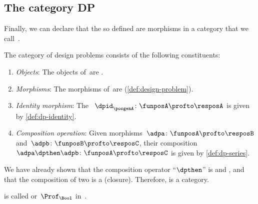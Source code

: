 \subsection{The category DP}

Finally, we can declare that the  so defined are morphisms in a category that we call~\DP.


\begin{definition}
    \label{def:DP}
    The category of design problems \DP consists of the following constituents:
    \begin{enumerate}
        \item \emph{Objects}: The objects of~\DP are .
        \item \emph{Morphisms}: The morphisms of~\DP are  (\cref{def:design-problem}).
        \item \emph{Identity morphism}: The ~$\dpid_\posgenA \colon \funposA \profto \resposA$ is given by \cref{def:dp-identity}.
        \item \emph{Composition operation}: Given morphisms~$\adpa \colon  \funposA \profto \resposB$ and~$\adpb \colon \funposB \profto \resposC$, their composition~$\adpa \dpthen \adpb\colon \funposA\profto \resposC$ is given by \cref{def:dp-series}.
    \end{enumerate}
\end{definition}

We have already shown that the composition operator ``$\dpthen$'' is  and , and that the composition of two  is a  (closure).
Therefore, \DP is a category.

\DP is called \feas or~$\Prof_{\Bool}$ in~\cite{fong2019}.




